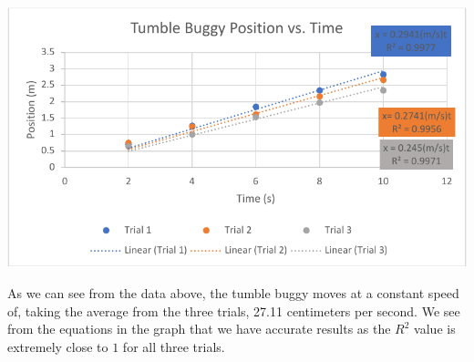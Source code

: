 \documentclass[12pt]{article}
\begin{document}
\begin{center}
\includegraphics{tumble_buggy_position_vs_time_graph.pdf}
\label{graph}
\end{center}

As we can see from the data above, the tumble buggy moves at a constant speed
of, taking the average from the three trials, 27.11 centimeters per second. We
see from the equations in the graph that we have accurate results as the $R^2$
value is extremely close to $1$ for all three trials.
\end{document}
